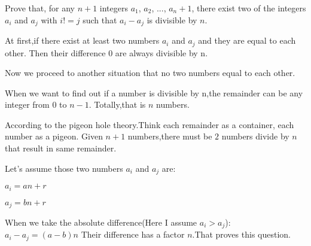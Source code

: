 \documentclass{article}
\begin{document}
Prove that, for any $n + 1$ integers $a_1$, $a_2$, ..., $a_n+1$, there exist two of the integers $a_i$
and $a_j$ with $i != j$ such that $a_i − a_j$ is divisible by $n$.
\bigskip  


At first,if there exist at least two numbers $a_i$ and $a_j$ and they are equal to each other. Then their difference 0 are always divisible by n.

Now we proceed to another situation that no two numbers equal to each other.

When we want to find out if a number is divisible by n,the remainder can be any integer from $0$ to $n-1$. Totally,that is $n$ numbers.

According to the pigeon hole theory.Think each remainder as a container, each number as a pigeon. Given $n+1$ numbers,there must be $2$ numbers divide by $n$ that result in same remainder.

Let's assume those two numbers $a_i$ and $a_j$ are:

$a_i = an + r$
			
$a_j = bn + r$

When we take the absolute difference(Here I assume $a_i > a_j$):
$a_i - a_j = (a-b)n$
Their difference has a factor $n$.That proves this question.
\end{document}
